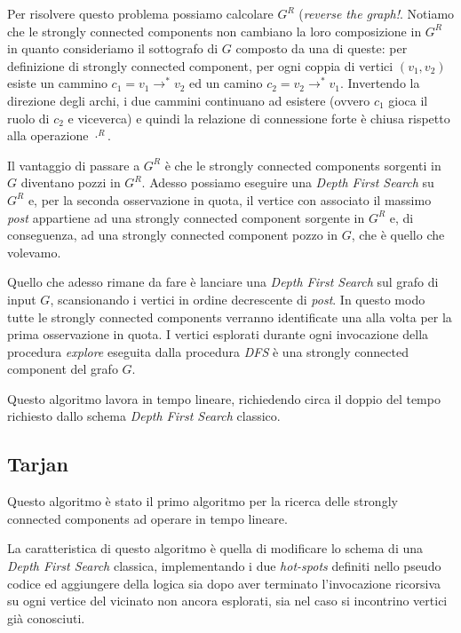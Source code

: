Per risolvere questo problema possiamo calcolare $G^{R}$
(\emph{reverse the graph!}. Notiamo che le strongly connected
components non cambiano la loro composizione in $G^{R}$ in quanto
consideriamo il sottografo di $G$ composto da una di queste: per
definizione di strongly connected component, per ogni coppia di
vertici $(v_{1}, v_{2})$ esiste un cammino $c_{1} =
v_{1}\rightarrow^{*} v_{2}$ ed un camino $c_{2} = v_{2}\rightarrow^{*}
v_{1}$. Invertendo la direzione degli archi, i due cammini continuano
ad esistere (ovvero $c_{1}$ gioca il ruolo di $c_{2}$ e viceverca) e
quindi la relazione di connessione forte \`e chiusa rispetto alla
operazione $\cdot ^{R}$.

Il vantaggio di passare a $G^{R}$ \`e che le strongly connected
components sorgenti in $G$ diventano pozzi in $G^{R}$. Adesso possiamo
eseguire una \emph{Depth First Search} su $G^{R}$ e, per la seconda
osservazione in quota, il vertice con associato il massimo \emph{post}
appartiene ad una strongly connected component sorgente in $G^{R}$ e,
di conseguenza, ad una strongly connected component pozzo in $G$, che
\`e quello che volevamo.

Quello che adesso rimane da fare \`e lanciare una \emph{Depth First
  Search} sul grafo di input $G$, scansionando i vertici in ordine
decrescente di \emph{post}. In questo modo tutte le strongly connected
components verranno identificate una alla volta per la prima
osservazione in quota. I vertici esplorati durante ogni invocazione
della procedura \emph{explore} eseguita dalla procedura \emph{DFS} \`e
una strongly connected component del grafo $G$.

Questo algoritmo lavora in tempo lineare, richiedendo circa il doppio
del tempo richiesto dallo schema \emph{Depth First Search} classico.

\subsection{Tarjan}
Questo algoritmo \`e stato il primo algoritmo per la ricerca delle
strongly connected components ad operare in tempo lineare.

La caratteristica di questo algoritmo \`e quella di modificare lo
schema di una \emph{Depth First Search} classica, implementando i due
\emph{hot-spots} definiti nello pseudo codice ed aggiungere della
logica sia dopo aver terminato l'invocazione ricorsiva su ogni vertice
del vicinato non ancora esplorati, sia nel caso si incontrino vertici
gi\`a conosciuti.

